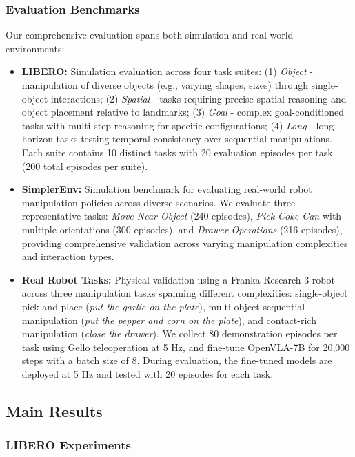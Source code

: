 \documentclass[letterpaper]{article}
\begin{document}
\subsubsection{Evaluation Benchmarks} Our comprehensive evaluation spans both simulation and real-world environments:
\begin{itemize}
\item \textbf{LIBERO:} Simulation evaluation across four task suites: (1) \textit{Object} - manipulation of diverse objects (e.g., varying shapes, sizes) through single-object interactions; (2) \textit{Spatial} - tasks requiring precise spatial reasoning and object placement relative to landmarks; (3) \textit{Goal} - complex goal-conditioned tasks with multi-step reasoning for specific configurations; (4) \textit{Long} - long-horizon tasks testing temporal consistency over sequential manipulations. Each suite contains 10 distinct tasks with 20 evaluation episodes per task (200 total episodes per suite).

\item \textbf{SimplerEnv:} Simulation benchmark for evaluating real-world robot manipulation policies across diverse scenarios. We evaluate three representative tasks: \textit{Move Near Object} (240 episodes), \textit{Pick Coke Can} with multiple orientations (300 episodes), and \textit{Drawer Operations} (216 episodes), providing comprehensive validation across varying manipulation complexities and interaction types.

\item \textbf{Real Robot Tasks:} Physical validation using a Franka Research 3 robot across three manipulation tasks spanning different complexities: single-object pick-and-place (\textit{put the garlic on the plate}), multi-object sequential manipulation (\textit{put the pepper and corn on the plate}), and contact-rich manipulation (\textit{close the drawer}). We collect 80 demonstration episodes per task using Gello teleoperation at 5 Hz, and fine-tune OpenVLA-7B for 20,000 steps with a batch size of 8. During evaluation, the fine-tuned models are deployed at 5 Hz and tested with 20 episodes for each task.

\end{itemize}


\subsection{Main Results}

\subsubsection{LIBERO Experiments}
\end{document}
